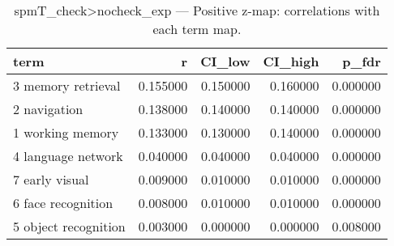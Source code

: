 \begin{table}
\caption{spmT_check>nocheck_exp — Positive z-map: correlations with each term map.}
\label{tab:spmT_check>nocheck_exp_pos}
\begin{tabular}{lrrrr}
\toprule
term & r & CI\_low & CI\_high & p\_fdr \\
\midrule
3 memory retrieval & 0.155000 & 0.150000 & 0.160000 & 0.000000 \\
2 navigation & 0.138000 & 0.140000 & 0.140000 & 0.000000 \\
1 working memory & 0.133000 & 0.130000 & 0.140000 & 0.000000 \\
4 language network & 0.040000 & 0.040000 & 0.040000 & 0.000000 \\
7 early visual & 0.009000 & 0.010000 & 0.010000 & 0.000000 \\
6 face recognition & 0.008000 & 0.010000 & 0.010000 & 0.000000 \\
5 object recognition & 0.003000 & 0.000000 & 0.000000 & 0.008000 \\
\bottomrule
\end{tabular}
\end{table}
